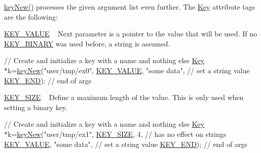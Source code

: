 \hyperlink{group__key_gad23c65b44bf48d773759e1f9a4d43b89}{key\+New()} processes the given argument list even further. The \hyperlink{classkdb_1_1Key}{Key} attribute tags are the following\+:
\begin{DoxyItemize}
\item \hyperlink{group__key_gga91fb3178848bd682000958089abbaf40ac66e4a49d09212b79f5754ca6db5bd2e}{K\+E\+Y\+\_\+\+V\+A\+L\+U\+E} ~\newline
 Next parameter is a pointer to the value that will be used. If no \hyperlink{group__key_gga91fb3178848bd682000958089abbaf40a1ca18d4e094ae7487d35ecedda2235ff}{K\+E\+Y\+\_\+\+B\+I\+N\+A\+R\+Y} was used before, a string is assumed. 
\begin{DoxyCodeInclude}
\textcolor{comment}{// Create and initialize a key with a name and nothing else}
\hyperlink{classkdb_1_1Key_a5679f5cae63caddd64a60388b9cc77fa}{Key} *k=\hyperlink{group__key_gad23c65b44bf48d773759e1f9a4d43b89}{keyNew}(\textcolor{stringliteral}{"user/tmp/ex0"},
        \hyperlink{group__key_gga91fb3178848bd682000958089abbaf40ac66e4a49d09212b79f5754ca6db5bd2e}{KEY\_VALUE}, \textcolor{stringliteral}{"some data"},    \textcolor{comment}{// set a string value}
        \hyperlink{group__key_gga91fb3178848bd682000958089abbaf40aa8adb6fcb92dec58fb19410eacfdd403}{KEY\_END});                  \textcolor{comment}{// end of args}
\end{DoxyCodeInclude}

\item \hyperlink{group__key_gga91fb3178848bd682000958089abbaf40a6d531b5c41445d19d0452eebdccbfa01}{K\+E\+Y\+\_\+\+S\+I\+Z\+E} ~\newline
 Define a maximum length of the value. This is only used when setting a binary key. 
\begin{DoxyCodeInclude}
\textcolor{comment}{// Create and initialize a key with a name and nothing else}
\hyperlink{classkdb_1_1Key_a5679f5cae63caddd64a60388b9cc77fa}{Key} *k=\hyperlink{group__key_gad23c65b44bf48d773759e1f9a4d43b89}{keyNew}(\textcolor{stringliteral}{"user/tmp/ex1"},
        \hyperlink{group__key_gga91fb3178848bd682000958089abbaf40a6d531b5c41445d19d0452eebdccbfa01}{KEY\_SIZE}, 4,               \textcolor{comment}{// has no effect on strings}
        \hyperlink{group__key_gga91fb3178848bd682000958089abbaf40ac66e4a49d09212b79f5754ca6db5bd2e}{KEY\_VALUE}, \textcolor{stringliteral}{"some data"},    \textcolor{comment}{// set a string value}
        \hyperlink{group__key_gga91fb3178848bd682000958089abbaf40aa8adb6fcb92dec58fb19410eacfdd403}{KEY\_END});                  \textcolor{comment}{// end of args}
\end{DoxyCodeInclude}


\end{DoxyItemize}
